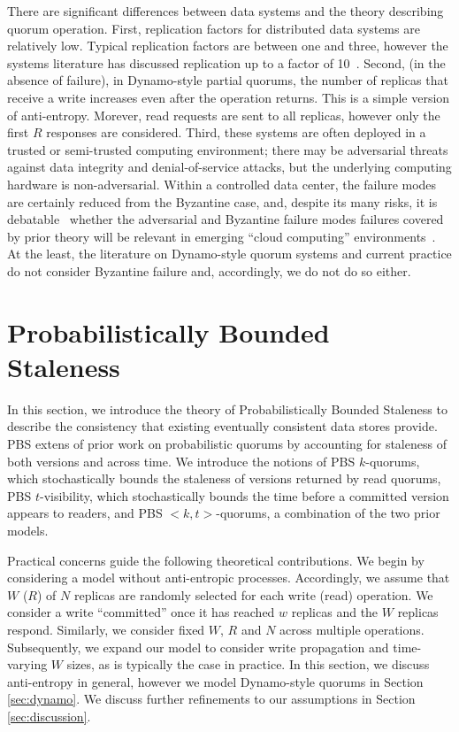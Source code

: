 \documentclass{vldb}
\begin{document}
There are significant differences between data systems and the theory
describing quorum operation.  First, replication factors for
distributed data systems are relatively low.  Typical replication
factors are between one and three, however the systems literature has
discussed replication up to a factor of 10~\cite{chain-replication}.
Second, (in the absence of failure), in Dynamo-style partial quorums,
the number of replicas that receive a write increases even after the
operation returns.  This is a simple version of anti-entropy.
Morever, read requests are sent to all replicas, however only the
first $R$ responses are considered.  Third, these systems are often
deployed in a trusted or semi-trusted computing environment; there may
be adversarial threats against data integrity and denial-of-service
attacks, but the underlying computing hardware is
non-adversarial. Within a controlled data center, the failure modes
are certainly reduced from the Byzantine case, and, despite its many
risks, it is debatable~\cite{birman-byzantine} whether the adversarial
and Byzantine failure modes failures covered by prior theory will be
relevant in emerging ``cloud computing''
environments~\cite{berkeleyview}. At the least, the literature on
Dynamo-style quorum systems and current practice do not consider
Byzantine failure and, accordingly, we do not do so either.


\section{Probabilistically Bounded\\Staleness}
\label{sec:pbs}

In this section, we introduce the theory of Probabilistically Bounded
Staleness to describe the consistency that existing eventually
consistent data stores provide.  PBS extens of prior work on
probabilistic quorums by accounting for staleness of both versions and
across time.  We introduce the notions of PBS $k$-quorums, which
stochastically bounds the staleness of versions returned by read
quorums, PBS $t$-visibility, which stochastically bounds the time
before a committed version appears to readers, and PBS $<k,
t>$-quorums, a combination of the two prior models.


Practical concerns guide the following theoretical contributions.  We
begin by considering a model without anti-entropic processes.
Accordingly, we assume that $W$ ($R$) of $N$ replicas are randomly
selected for each write (read) operation.  We consider a write
``committed'' once it has reached $w$ replicas and the $W$ replicas
respond.  Similarly, we consider fixed $W$, $R$ and $N$ across
multiple operations. Subsequently, we expand our model to consider
write propagation and time-varying $W$ sizes, as is typically the case
in practice.  In this section, we discuss anti-entropy in general,
however we model Dynamo-style quorums in Section
\ref{sec:dynamo}. We discuss further refinements to our
assumptions in Section \ref{sec:discussion}.
\end{document}
